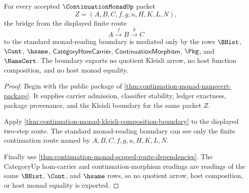 \begin{theorem}
\label{thm:continuation-monad-route-bridge-boundary}
For every accepted $\ContinuationMonadUp$ packet
$$
Z=(A,B,C,f,g,u,H,K,L,N),
$$
the bridge from the displayed finite route
$$
A \xrightarrow{\,f\,} B \xrightarrow{\,g\,} C
$$
to the standard monad-reading boundary is mediated only by the rows $\BHist$, $\Cont$, $\hsame$, $\mathsf{CategoryHomCarrier}$, $\mathsf{ContinuationMorphism}$, $\Pkg$, and $\NameCert$. The boundary exports no quotient Kleisli arrow, no host function composition, and no host monad equality.
\end{theorem}
\begin{proof}
Begin with the public package of \autoref{thm:continuation-monad-namecert-package}. It supplies carrier admission, classifier stability, ledger exactness, package provenance, and the Kleisli boundary for the same packet $Z$.

Apply \autoref{thm:continuation-monad-kleisli-composition-boundary} to the displayed two-step route. The standard monad-reading boundary can see only the finite continuation route named by $A,B,C,f,g,u,H,K,L,N$.

Finally use \autoref{thm:continuation-monad-scoped-route-dependencies}. The CategoryUp hom-carrier and continuation-morphism readings are readings of the same $\BHist$, $\Cont$, and $\hsame$ rows, so no quotient arrow, host composition, or host monad equality is exported.
\end{proof}

